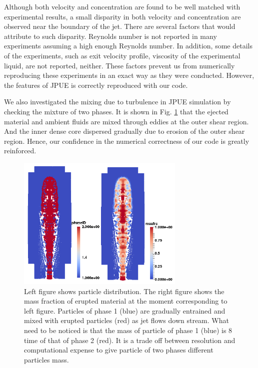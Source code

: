 \documentclass[journal abbreviation, manuscript]{copernicus}
\begin{document}
Although both velocity and concentration are found to be well matched with experimental results, a small disparity in both velocity and concentration are observed near the boundary of the jet. There are several factors that would attribute to such disparity. Reynolds number is not reported in many experiments assuming a high enough Reynolds number. In addition, some details of the experiments, such as exit velocity profile, viscosity of the experimental liquid, are not reported, neither. These factors prevent us from numerically reproducing these experiments in an exact way as they were conducted. However, the features of JPUE is correctly reproduced with our code.

We also investigated the mixing due to turbulence in JPUE simulation by checking the mixture of two phases. It is shown in Fig. \ref{fig:Turb_mixing} that the ejected material and ambient fluids are mixed through eddies at the outer shear region. And the inner dense core dispersed gradually due to erosion of the outer shear region. Hence, our confidence in the numerical correctness of our code  is greatly reinforced.

\begin{figure}
\includegraphics[width=8cm]{JPUE_entrainment.png}
\caption{Left figure shows particle distribution. The right figure shows the mass fraction of erupted material at the moment corresponding to left figure. Particles of phase 1 (blue) are gradually entrained and mixed with erupted particles (red) as jet flows down stream. What need to be noticed is that the mass of particle of phase 1 (blue) is 8 time of that of phase 2 (red). It is a trade off between resolution and computational expense to give particle of two phases different particles mass.}
\label{fig:Turb_mixing}
\end{figure}
\end{document}
